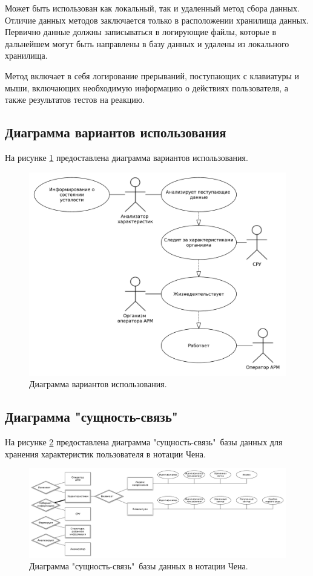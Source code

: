 Может быть использован как локальный, так и удаленный метод сбора данных. Отличие данных методов заключается только в расположении хранилища данных. Первично данные должны записываться в логирующие файлы, которые в дальнейшем могут быть направлены в базу данных и удалены из локального хранилища.

Метод включает в себя логирование прерываний, поступающих с клавиатуры и мыши, включающих необходимую информацию о действиях пользователя, а также результатов тестов на реакцию.

\subsection{Диаграмма вариантов использования}
На рисунке \ref{fig:useCase} предоставлена диаграмма вариантов использования.
\begin{figure}[H]
	\centering
	\includegraphics[width=\textwidth]{img/useCaseDiagramPresentation.pdf}
	\caption{Диаграмма вариантов использования.}
	\label{fig:useCase}
\end{figure}


\subsection{Диаграмма "сущность-связь"\ }
На рисунке \ref{fig:chen} предоставлена диаграмма "сущность-связь"\ базы данных для хранения характеристик пользователя в нотации Чена.
\begin{figure}[H]
	\centering
	\includegraphics[width=\textwidth]{img/chenERDiagram.pdf}
	\caption{Диаграмма "сущность-связь"\ базы данных в нотации Чена.}
	\label{fig:chen}
\end{figure}


